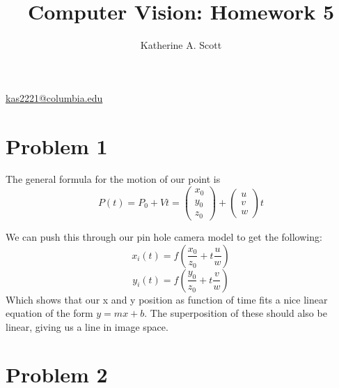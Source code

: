 \documentclass{article}
\begin{document}
\title{Computer Vision: Homework 5}

\author{Katherine A. Scott}
\maketitle
\mbox{}
\begin{center}
\href{mailto:katherineAScott@gmail.com}{kas2221@columbia.edu}

\end{center}
\section{Problem 1}
The general formula for the motion of our point is
\[
P(t)=P_0+Vt= \begin{pmatrix} x_0 \\ y_0 \\ z_0 \end{pmatrix} + \begin{pmatrix} u \\ v \\ w \end{pmatrix}t
\]

We can push this through our pin hole camera model to get the
following:
\[
x_i(t)=f(\frac{x_0}{z_0}+t\frac{u}{w})
\]
\[
y_i(t)=f(\frac{y_0}{z_0}+t\frac{v}{w})
\]
Which shows that our x and y position as function of time fits a nice
linear equation of the form $y=mx+b$. The superposition of these
should also be linear, giving us a line in image space. 


\section{Problem 2}
\end{document}
